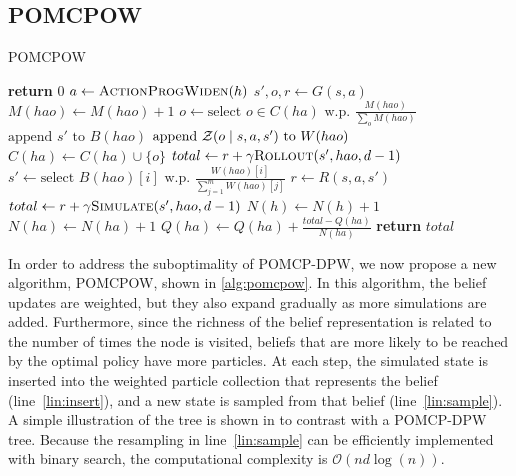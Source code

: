 \subsection{POMCPOW}

\begin{algorithm}[t]
    \caption{POMCPOW} \label{alg:pomcpow}
    \begin{algorithmic}[1]
                \State \textbf{return} $0$
            \EndIf
            \State $a \gets \Call{ActionProgWiden}{h}$
            \State $s',o,r \gets G(s,a)$
                \State $M(hao) \gets M(hao) + 1$
            \Else
                \State $o \gets \text{select } o \in C(ha) \text{ w.p. } \frac{M(hao)}{\sum_{o} M(hao)}$
            \EndIf
            \State $\text{append } s' \text{ to } B(hao)$ \label{lin:insert}
            \State $\text{append } \mathcal{Z}(o \mid s, a, s') \text{ to } W(hao)$ \label{lin:weight}
             
                \State $C(ha) \gets C(ha) \cup \{o\}$
                \State $total \gets r + \gamma \Call{Rollout}{s', hao, d-1}$
            \Else
                \State $s' \gets \text{select } B(hao)[i] \text{ w.p. } \frac{W(hao)[i]}{\sum_{j=1}^m W(hao)[j]}$ \label{lin:sample}
                \State $r \gets R(s,a,s')$
                \State $total \gets r + \gamma \Call{Simulate}{s', hao, d-1}$
            \EndIf
            \State $N(h) \gets N(h)+1$
            \State $N(ha) \gets N(ha)+1$
            \State $Q(ha) \gets Q(ha) + \frac{total - Q(ha)}{N(ha)}$
            \State \textbf{return} $total$
        \EndProcedure
    \end{algorithmic}
\end{algorithm}


In order to address the suboptimality of POMCP-DPW, we now propose a new algorithm, POMCPOW, shown in \cref{alg:pomcpow}.
In this algorithm, the belief updates are weighted, but they also expand gradually as more simulations are added.
Furthermore, since the richness of the belief representation is related to the number of times the node is visited, beliefs that are more likely to be reached by the optimal policy have more particles.
At each step, the simulated state is inserted into the weighted particle collection that represents the belief (line~\ref{lin:insert}), and a new state is sampled from that belief (line~\ref{lin:sample}).
A simple illustration of the tree is shown in  to contrast with a POMCP-DPW tree.
Because the resampling in line~\ref{lin:sample} can be efficiently implemented with binary search, the computational complexity is $\mathcal{O}(n d \log(n))$.

